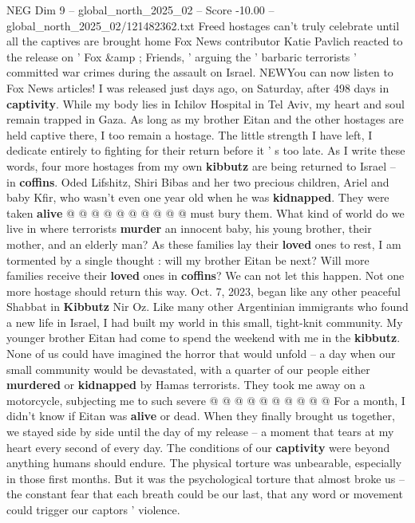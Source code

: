 \begin{textsample}{NEG Dim 9 – global\_north\_2025\_02 – Score -10.00 – global\_north\_2025\_02/121482362.txt}  \label{ex:f9_neg_054}
Freed hostages can't truly celebrate until all the captives are brought home Fox News contributor Katie Pavlich reacted to the release on ' Fox \&amp ; Friends, ' arguing the ' barbaric terrorists ' committed war crimes during the assault on Israel.
NEWYou can now listen to Fox News articles!
I was released just days ago, on Saturday, after 498 days in \textbf{captivity}.
While my body lies in Ichilov Hospital in Tel Aviv, my heart and soul remain trapped in Gaza.
As long as my brother Eitan and the other hostages are held captive there, I too remain a hostage.
The little strength I have left, I dedicate entirely to fighting for their return before it ' s too late.
As I write these words, four more hostages from my own \textbf{kibbutz} are being returned to Israel -- in \textbf{coffins}.
Oded Lifshitz, Shiri Bibas and her two precious children, Ariel and baby Kfir, who wasn't even one year old when he was \textbf{kidnapped}.
They were taken \textbf{alive} @ @ @ @ @ @ @ @ @ @ must bury them.
What kind of world do we live in where terrorists \textbf{murder} an innocent baby, his young brother, their mother, and an elderly man?
As these families lay their \textbf{loved} ones to rest, I am tormented by a single thought : will my brother Eitan be next?
Will more families receive their \textbf{loved} ones in \textbf{coffins}?
We can not let this happen.
Not one more hostage should return this way.
Oct. 7, 2023, began like any other peaceful Shabbat in \textbf{Kibbutz} Nir Oz.
Like many other Argentinian immigrants who found a new life in Israel, I had built my world in this small, tight-knit community.
My younger brother Eitan had come to spend the weekend with me in the \textbf{kibbutz}.
None of us could have imagined the horror that would unfold -- a day when our small community would be devastated, with a quarter of our people either \textbf{murdered} or \textbf{kidnapped} by Hamas terrorists.
They took me away on a motorcycle, subjecting me to such severe @ @ @ @ @ @ @ @ @ @ For a month, I didn't know if Eitan was \textbf{alive} or dead.
When they finally brought us together, we stayed side by side until the day of my release -- a moment that tears at my heart every second of every day.
The conditions of our \textbf{captivity} were beyond anything humans should endure.
The physical torture was unbearable, especially in those first months.
But it was the psychological torture that almost broke us -- the constant fear that each breath could be our last, that any word or movement could trigger our captors ' violence.

\end{textsample}
